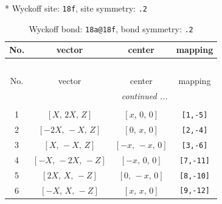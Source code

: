 \documentclass[fleqn,8pt]{jsarticle}
\begin{document}
* Wyckoff site: {\tt 18f}, site symmetry: {\tt .2}
\renewcommand{\arraystretch}{1.2}
\begin{longtable}{cccc}
\caption{Wyckoff bond: {\tt 18a@18f}, bond symmetry: {\tt .2}}
 \\
 \hline \hline
No. & vector & center & mapping \\ \hline \endfirsthead

\multicolumn{3}{l}{\tablename\ \thetable{}} \\
 \hline \hline
No. & vector & center & mapping \\ \hline \endhead

 \hline \hline
\multicolumn{3}{r}{\footnotesize\it continued ...} \\ \endfoot

 \hline \hline
\multicolumn{3}{r}{} \\ \endlastfoot

1 & $\left[ X,\, 2 X,\, Z \right]$ & $\left[ x,\, 0,\, 0 \right]$ & {\tt [1,-5]} \\ \hline
2 & $\left[ - 2 X,\, - X,\, Z \right]$ & $\left[ 0,\, x,\, 0 \right]$ & {\tt [2,-4]} \\ \hline
3 & $\left[ X,\, - X,\, Z \right]$ & $\left[ - x,\, - x,\, 0 \right]$ & {\tt [3,-6]} \\ \hline
4 & $\left[ - X,\, - 2 X,\, - Z \right]$ & $\left[ - x,\, 0,\, 0 \right]$ & {\tt [7,-11]} \\ \hline
5 & $\left[ 2 X,\, X,\, - Z \right]$ & $\left[ 0,\, - x,\, 0 \right]$ & {\tt [8,-10]} \\ \hline
6 & $\left[ - X,\, X,\, - Z \right]$ & $\left[ x,\, x,\, 0 \right]$ & {\tt [9,-12]} \\
\end{longtable}
\renewcommand{\arraystretch}{1.2}
\end{document}
